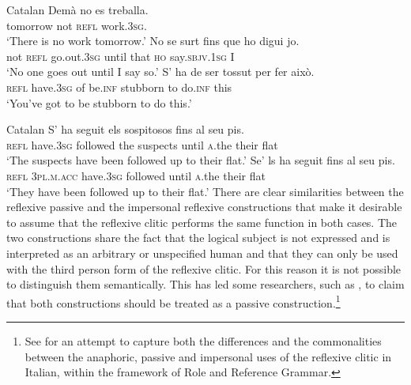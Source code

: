 \documentclass[output=paper,hidelinks]{langscibook}
\begin{document}
\ea\label{ex:Romance:46} Catalan
\ea\label{ex:Romance:46a}
\gll Demà no es treballa.\\
       tomorrow not \textsc{refl} work.\textsc{3sg}.\\
\glt   `There is no work tomorrow.'
\ex\label{ex:Romance:46b}
\gll
 No se surt fins que ho digui jo.\\
       not \textsc{refl} go.out.\textsc{3sg} until that \textsc{ho} say.\textsc{sbjv}.\textsc{1sg} I\\
\glt   `No one goes out until I say so.'
\ex\label{ex:Romance:46c}
\gll
S' ha de ser tossut per fer això.\\
 \textsc{refl} have.\textsc{3sg} of be.\textsc{inf} stubborn to do.\textsc{inf} this\\
 \glt   `You've got to be stubborn to do this.'
 \z\z

\ea\label{ex:Romance:47} Catalan
\ea\label{ex:Romance:47a}
\gll S' ha seguit els sospitosos fins al seu pis.\\
\textsc{refl} have.\textsc{3sg} followed the suspects until \textsc{a}.the their flat\\
\glt   `The suspects have been followed up to their flat.'
\newpage
\ex\label{ex:Romance:47b}
\gll
 Se' ls ha seguit fins al seu pis.\\
       \textsc{refl} \textsc{3pl.m.acc} have.\textsc{3sg} followed until \textsc{a}.the their flat\\
       \glt   `They have been followed up to their flat.'
       \z\z
There are clear similarities between the reflexive passive and the impersonal reflexive constructions that make it desirable to assume that the reflexive clitic performs the same function in both cases. The two constructions share the fact that the logical subject is not expressed and is interpreted as an arbitrary or unspecified human and that they can only be used with the third person form of the reflexive clitic. For this reason it is not possible to distinguish them semantically. This has led some researchers, such as \citet{Cardona2015}, to claim that both constructions should be treated as a passive construction.\footnote{See \citet{Bentley2006} for an attempt to capture both the differences and the commonalities between the anaphoric, passive and impersonal uses of the reflexive clitic in Italian, within the framework of Role and Reference Grammar.}
\end{document}
